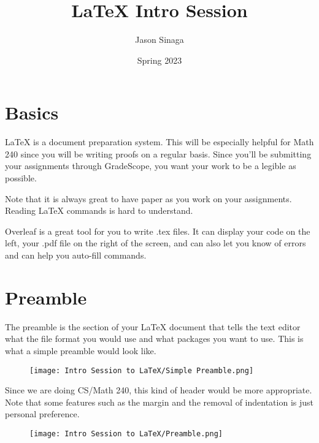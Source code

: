 \documentclass[11pt]{article}
\title{\LaTeX{} Intro Session}
\author{Jason Sinaga}
\date{Spring 2023}
\begin{document}
\maketitle

\section{Basics}
\LaTeX{} is a document preparation system. This will be especially helpful for Math 240 since you will be writing proofs on a regular basis. Since you'll be submitting your assignments through GradeScope, you want your work to be a legible as possible.
\vspace{3mm}

Note that it is always great to have paper as you work on your assignments. Reading \LaTeX{} commands is hard to understand.
\vspace{3mm}

Overleaf is a great tool for you to write .tex files. It can display your code on the left, your .pdf file on the right of the screen, and can also let you know of errors and can help you auto-fill commands. 
\section{Preamble}
The preamble is the section of your \LaTeX{} document that tells the text editor what the file format you would use and what packages you want to use. This is what a simple preamble would look like.

\vspace{3mm}
\begin{figure}[htbp]
\centerline{\texttt{[image: Intro Session to LaTeX/Simple Preamble.png]}}
\end{figure}
\vspace{3mm}

Since we are doing CS/Math 240, this kind of header would be more appropriate. Note that some features such as the margin and the removal of indentation is just personal preference.

\vspace{3mm}
\begin{figure}[htbp]
\centerline{\texttt{[image: Intro Session to LaTeX/Preamble.png]}}
\end{figure}
\vspace{3mm}
\end{document}
